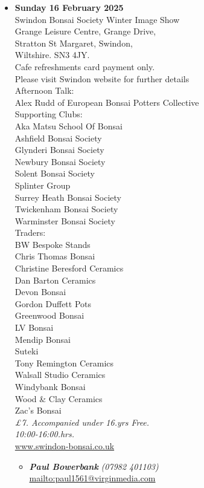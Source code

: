 \begin{itemize}
    \item \textbf{Sunday 16 February 2025}
    \\
    Swindon Bonsai Society Winter Image Show \\
    Grange Leisure Centre, Grange Drive, \\
    Stratton St Margaret, Swindon, \\
    Wiltshire. SN3 4JY. \\
    Cafe refreshments card payment only. \\
    Please visit Swindon website for further details \\
    Afternoon Talk: \\
    Alex Rudd of European Bonsai Potters Collective \\
    Supporting Clubs: \\
    Aka Matsu School Of Bonsai \\
    Ashfield Bonsai Society \\
    Glynderi Bonsai Society \\
    Newbury Bonsai Society \\
    Solent Bonsai Society \\
    Splinter Group \\
    Surrey Heath Bonsai Society \\
    Twickenham Bonsai Society \\
    Warminster Bonsai Society \\
    Traders: \\
    BW Bespoke Stands \\
    Chris Thomas Bonsai \\
    Christine Beresford Ceramics \\
    Dan Barton Ceramics \\
    Devon Bonsai \\
    Gordon Duffett Pots \\
    Greenwood Bonsai \\
    LV Bonsai \\
    Mendip Bonsai \\
    Suteki \\
    Tony Remington Ceramics \\
    Walsall Studio Ceramics \\
    Windybank Bonsai \\
    Wood \& Clay Ceramics \\
    Zac's Bonsai
    \\
    \emph{£7. Accompanied under 16.yrs Free.} \\
    \emph{10:00-16:00.hrs.}
    \\
    \href{http://www.swindon-bonsai.co.uk/}{www.swindon-bonsai.co.uk}
    \begin{itemize}
        \item \textbf{\emph{Paul Bowerbank}} \emph{(07982 401103)} \\
        \href{mailto:mailto:paul1561@virginmedia.com}{mailto:paul1561@virginmedia.com} 
    \end{itemize}


\end{itemize}
